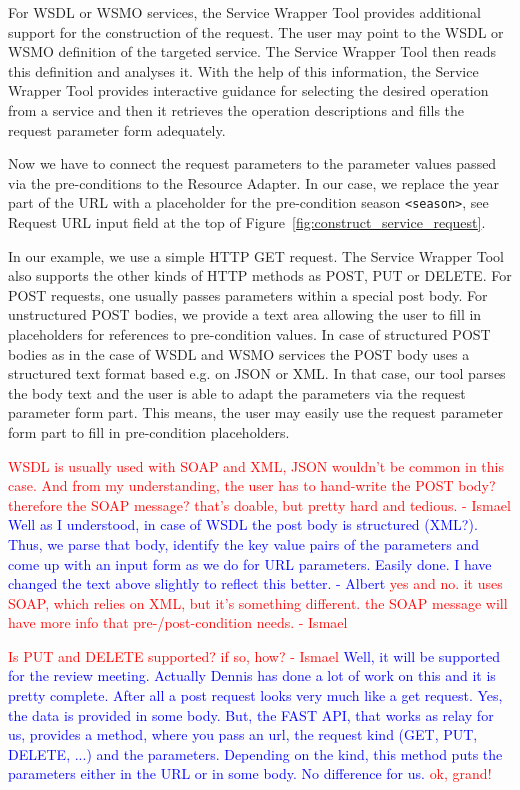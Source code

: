 \documentclass{fast_latex}
\begin{document}
For WSDL or WSMO services, the Service Wrapper Tool provides additional support for the construction of the request. The user may point to the WSDL or WSMO definition of the targeted service. The Service Wrapper Tool then reads this definition and analyses it. With the help of this information, the Service Wrapper Tool provides interactive guidance for selecting the desired operation from a service and then it retrieves the operation descriptions and fills the request parameter form adequately.

Now we have to connect the request parameters to the parameter values passed via the pre-conditions to the Resource Adapter. In our case, we replace the year part of the URL with a placeholder for the pre-condition season \verb|<season>|, see Request URL input field at the top of Figure~\ref{fig:construct_service_request}.

In our example, we use a simple HTTP GET request. The Service Wrapper Tool also supports the other kinds of HTTP methods as POST, PUT or DELETE. For POST requests, one usually passes parameters within a special post body. For unstructured POST bodies, we provide a text area allowing the user to fill in placeholders for references to pre-condition values. In case of structured POST bodies as in the case of WSDL and WSMO services the POST body uses a structured text format based e.g. on JSON or XML. In that case, our tool parses the body text and the user is able to adapt the parameters via the request parameter form part. This means, the user may easily use the request parameter form part to fill in pre-condition placeholders.

\textcolor{red}{WSDL is usually used with SOAP and XML, JSON wouldn't be common in this case. And from my understanding, the user has to hand-write the POST body? therefore the SOAP message? that's doable, but pretty hard and tedious. - Ismael}
\textcolor{blue}{Well as I understood, in case of WSDL the post body is structured (XML?). Thus, we parse that body, identify the key value pairs of the parameters and come up with an input form as we do for URL parameters. Easily done. 
I have changed the text above slightly to reflect this better. - Albert}
\textcolor{red}{yes and no. it uses SOAP, which relies on XML, but it's something different. the SOAP message will have more info that pre-/post-condition needs. - Ismael}


\textcolor{red}{Is PUT and DELETE supported? if so, how? - Ismael}
\textcolor{blue}{Well, it will be supported for the review meeting. Actually Dennis has done a lot of work on this and it is pretty complete. 
After all a post request looks very much like a get request. Yes, the data is provided in some body. But, the FAST API, that works as relay for us, provides a method, where you pass an url, the request kind (GET, PUT, DELETE, ...) and the parameters. Depending on the kind, this method puts the parameters either in the URL or in some body. No difference for us.}
\textcolor{red}{ok, grand!}
\end{document}
